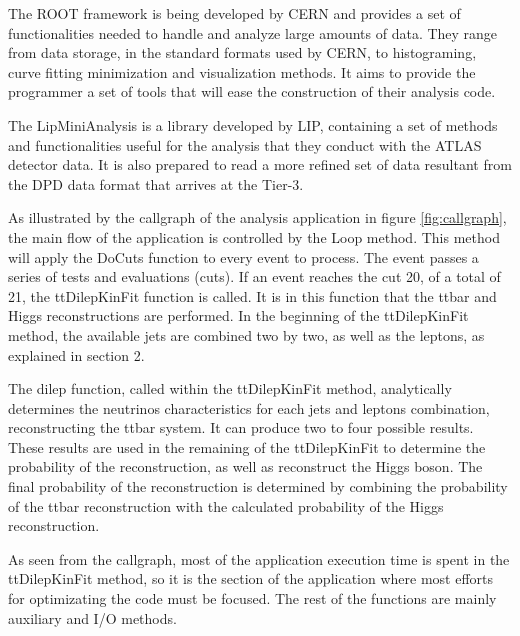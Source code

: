 The ROOT framework is being developed by CERN and provides a set of functionalities needed to handle and analyze large amounts of data. They range from data storage, in the standard formats used by CERN, to histograming, curve fitting minimization and visualization methods. It aims to provide the programmer a set of tools that will ease the construction of their analysis code.

The LipMiniAnalysis is a library developed by LIP, containing a set of methods and functionalities useful for the analysis that they conduct with the ATLAS detector data. It is also prepared to read a more refined set of data resultant from the DPD data format that arrives at the Tier-3.

As illustrated by the callgraph of the analysis application in figure \ref{fig:callgraph}, the main flow of the application is controlled by the Loop method. This method will apply the DoCuts function to every event to process. The event passes a series of tests and evaluations (cuts). If an event reaches the cut 20, of a total of 21, the ttDilepKinFit function is called. It is in this function that the ttbar and Higgs reconstructions are performed. In the beginning of the ttDilepKinFit method, the available jets are combined two by two, as well as the leptons, as explained in section 2.

The dilep function, called within the ttDilepKinFit method, analytically determines the neutrinos characteristics for each jets and leptons combination, reconstructing the ttbar system. It can produce two to four possible results. These results are used in the remaining of the ttDilepKinFit to determine the probability of the reconstruction, as well as reconstruct the Higgs boson. The final probability of the reconstruction is determined by combining the probability of the ttbar reconstruction with the calculated probability of the Higgs reconstruction.

As seen from the callgraph, most of the application execution time is spent in the ttDilepKinFit method, so it is the section of the application where most efforts for optimizating the code must be focused. The rest of the functions are mainly auxiliary and I/O methods.

\newpage
